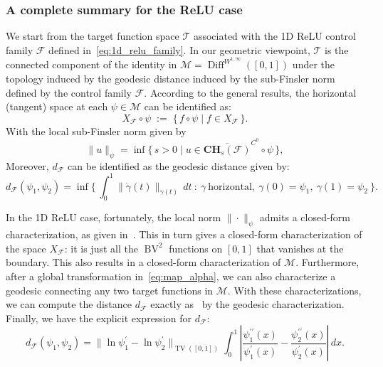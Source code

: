 \documentclass[12pt]{amsart}
\numberwithin{equation}{section}
\theoremstyle{remark}
\begin{document}
\subsubsection{A complete summary for the ReLU case}
We start from the target function space $\mathcal T$ associated with the 1D ReLU control family $\mathcal F$ defined in~\eqref{eq:1d_relu_family}.
In our geometric viewpoint, $\mathcal T$ is the connected component of the identity in $\mathcal M =\operatorname{Diff}^{W^{1,\infty}}([0,1])$ under the topology induced by the geodesic distance induced by the sub-Finsler norm defined by the control family $\mathcal F$.
According to the general results, the horizontal (tangent) space at each $\psi\in\mathcal M$ can be identified as:
\begin{equation}
    X_{\mathcal F}\circ \psi \;:=\;\{\, f\circ \psi \mid f\in X_{\mathcal F}\,\}.
\end{equation}
With the local sub-Finsler norm given by
\begin{equation}
    \|u\|_{\psi}=\inf\{\,s>0\mid u\in \overline{\mathbf{CH}_s(\mathcal F)}^{C^0}\circ \psi\,\},
\end{equation}
Moreover, $d_{\mathcal F}$ can be identified as the geodesic distance given by:
\begin{equation}
d_{\mathcal F}(\psi_1,\psi_2)=\inf\Big\{\ \int_0^1 \|\dot\gamma(t)\|_{\gamma(t)}\,dt\ :\ \gamma\ \text{horizontal},\ \gamma(0)=\psi_1,\ \gamma(1)=\psi_2\ \Big\}.
\end{equation}

In the 1D ReLU case, fortunately, the local norm $\|\cdot\|_\psi$ admits a closed-form characterization, as given in~.
This in turn gives a closed-form characterization of the space $X_{\mathcal F}$: it is just all the $\operatorname{BV}^2$ functions on $[0,1]$ that vanishes at the boundary.
This also results in a closed-form characterization of $\mathcal M$.
Furthermore, after a global transformation in~\eqref{eq:map_alpha}, we can also characterize a geodesic connecting any two target functions in $\mathcal M$.
With these characterizations, we can compute the distance $d_{\mathcal F}$ exactly as~ by the geodesic characterization. Finally, we have the explicit expression for $d_{\mathcal F}$:
\begin{equation}
    d_{\mathcal F}(\psi_1, \psi_2) =\|\ln \psi_1^\prime -\ln \psi_2^\prime \|_{\operatorname{TV}([0,1])} \int_0^1 \left| \frac{\psi_1^{\prime\prime}(x)}{\psi_1^\prime(x)} - \frac{\psi_2^{\prime\prime}(x)}{\psi_2^\prime(x)} \right|\, dx.
\end{equation}
\end{document}
